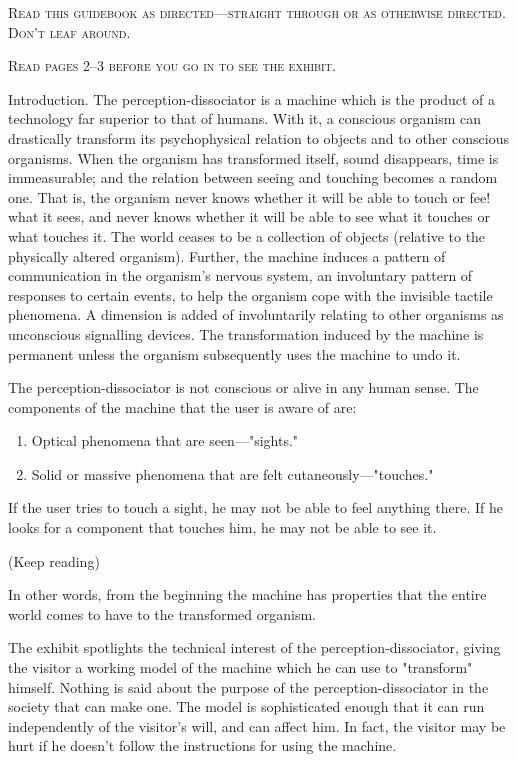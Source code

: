 \documentclass[10pt,twoside]{memoir}
\begin{document}
\begin{enumerate}
{\begin{enumerate}
\begin{sysrules}
\begin{sysrules}
\begin{sysrules}
\begin{sysrules}
{\begin{enumerate}
\begin{sysrules}
\textsc{Read this guidebook as directed---straight through or as otherwise directed. Don't leaf around.}


\textsc{Read pages 2--3 before you go in to see the exhibit.}

\clearpage

Introduction. The perception-dissociator is a machine which is the 
product of a technology far superior to that of humans. With it, a conscious 
organism can drastically transform its psychophysical relation to objects and 
to other conscious organisms. When the organism has transformed itself, 
sound disappears, time is immeasurable; and the relation between seeing and 
touching becomes a random one. That is, the organism never knows whether 
it will be able to touch or fee! what it sees, and never knows whether it will 
be able to see what it touches or what touches it. The world ceases to be a 
collection of objects (relative to the physically altered organism). Further, 
the machine induces a pattern of communication in the organism's nervous 
system, an involuntary pattern of responses to certain events, to help the 
organism cope with the invisible tactile phenomena. A dimension is added of 
involuntarily relating to other organisms as unconscious signalling devices. 
The transformation induced by the machine is permanent unless the 
organism subsequently uses the machine to undo it. 


The perception-dissociator is not conscious or alive in any human sense. 
The components of the machine that the user is aware of are: 
\begin{enumerate}
	\item Optical phenomena that are seen---"sights." 
	\item Solid or massive phenomena that are felt cutaneously---"touches." 
\end{enumerate}
If the user tries to touch a sight, he may not be 
able to feel anything there. If he looks for a component that touches him, he 
may not be able to see it. 


(Keep reading) 

\clearpage

In other words, from the beginning the machine has properties that the 
entire world comes to have to the transformed organism. 

The exhibit spotlights the technical interest of the 
perception-dissociator, giving the visitor a working model of the machine 
which he can use to "transform" himself. Nothing is said about the purpose 
of the perception-dissociator in the society that can make one. The model is 
sophisticated enough that it can run independently of the visitor's will, and 
can affect him. In fact, the visitor may be hurt if he doesn't follow the 
instructions for using the machine. 



\end{sysrules}
\end{enumerate}}
\end{sysrules}
\end{sysrules}
\end{sysrules}
\end{sysrules}
\end{enumerate}}
\end{enumerate}
\end{document}

